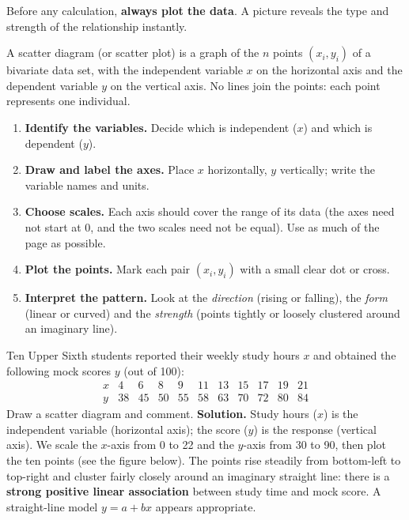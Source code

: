 \documentclass[11pt]{article}
\newcommand{\cle}[1]{{\popxbold\color{popdark}#1}}
\newcounter{popsec}
\newcounter{popsub}
\newcommand{\courssub}[1]{%
  \stepcounter{popsub}%
  \par\vspace{9pt}\noindent{\popxbold\fontsize{11.5}{13}\selectfont\color{popink}{\color{poporange}\thepopsec.\thepopsub}\hspace{6pt}#1}\par\nopagebreak\vspace{4pt}
}
\begin{document}
\courssub{The Scatter Diagram}

Before any calculation, \textbf{always plot the data}. A picture reveals the type and strength of the relationship instantly.

\begin{definition}
A \cle{scatter diagram} (or scatter plot) is a graph of the $n$ points $(x_i, y_i)$ of a bivariate data set, with the independent variable $x$ on the horizontal axis and the dependent variable $y$ on the vertical axis. No lines join the points: each point represents one individual.
\end{definition}

\begin{methode}
\begin{enumerate}
\item \textbf{Identify the variables.} Decide which is independent ($x$) and which is dependent ($y$).
\item \textbf{Draw and label the axes.} Place $x$ horizontally, $y$ vertically; write the variable names and units.
\item \textbf{Choose scales.} Each axis should cover the range of its data (the axes need not start at 0, and the two scales need not be equal). Use as much of the page as possible.
\item \textbf{Plot the points.} Mark each pair $(x_i, y_i)$ with a small clear dot or cross.
\item \textbf{Interpret the pattern.} Look at the \emph{direction} (rising or falling), the \emph{form} (linear or curved) and the \emph{strength} (points tightly or loosely clustered around an imaginary line).
\end{enumerate}
\end{methode}

\begin{exoresolu}
Ten Upper Sixth students reported their weekly study hours $x$ and obtained the following mock scores $y$ (out of 100):
\[
\begin{array}{c|cccccccccc}
x & 4 & 6 & 8 & 9 & 11 & 13 & 15 & 17 & 19 & 21 \\ \hline
y & 38 & 45 & 50 & 55 & 58 & 63 & 70 & 72 & 80 & 84
\end{array}
\]
Draw a scatter diagram and comment.
\tcblower
\textbf{Solution.} Study hours ($x$) is the independent variable (horizontal axis); the score ($y$) is the response (vertical axis). We scale the $x$-axis from 0 to 22 and the $y$-axis from 30 to 90, then plot the ten points (see the figure below). The points rise steadily from bottom-left to top-right and cluster fairly closely around an imaginary straight line: there is a \textbf{strong positive linear association} between study time and mock score. A straight-line model $y = a + bx$ appears appropriate.
\end{exoresolu}
\end{document}
